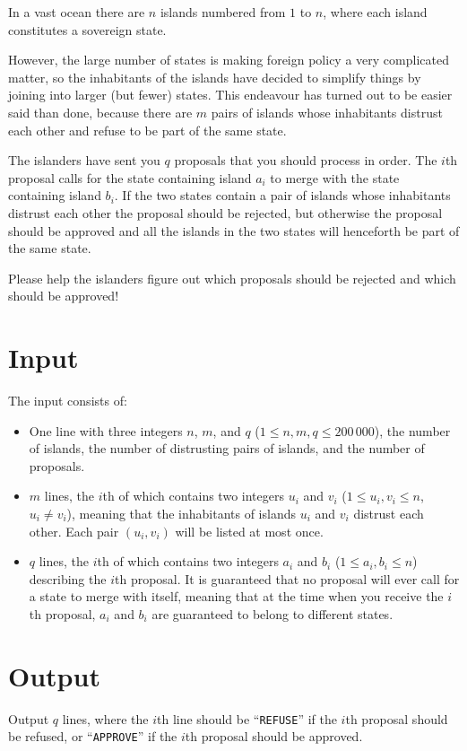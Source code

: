 In a vast ocean there are $n$ islands numbered from $1$ to $n$, where each
island constitutes a sovereign state.

However, the large number of states is making foreign policy a very complicated
matter, so the inhabitants of the islands have decided to simplify things by
joining into larger (but fewer) states. This endeavour has turned out to be
easier said than done, because there are $m$ pairs of islands whose inhabitants
distrust each other and refuse to be part of the same state.

The islanders have sent you $q$ proposals that you should process in order. The
$i$th proposal calls for the state containing island $a_i$ to merge with the
state containing island $b_i$. If the two states contain a pair of islands
whose inhabitants distrust each other the proposal should be rejected, but
otherwise the proposal should be approved and all the islands in the two states
will henceforth be part of the same state.

Please help the islanders figure out which proposals should be rejected and
which should be approved!

\section*{Input}
The input consists of:
\begin{itemize}
  \item One line with three integers $n$, $m$, and $q$ ($1 \leq n,m,q \leq
        200\,000$), the number of islands, the number of distrusting pairs of
        islands, and the number of proposals.
  \item $m$ lines, the $i$th of which contains two integers $u_i$ and $v_i$ ($1
        \leq u_i,v_i \leq n$, $u_i \neq v_i$), meaning that the inhabitants of
        islands $u_i$ and $v_i$ distrust each other. Each pair $(u_i, v_i)$ will be
        listed at most once.
  \item $q$ lines, the $i$th of which contains two integers $a_i$ and $b_i$ ($1
        \leq a_i,b_i \leq n$) describing the $i$th proposal. It is guaranteed
        that no proposal will ever call for a state to merge with itself, meaning
        that at the time when you receive the $i$th proposal, $a_i$ and $b_i$ are
        guaranteed to belong to different states.
\end{itemize}

\section*{Output}
Output $q$ lines, where the $i$th line should be ``\texttt{REFUSE}'' if the $i$th
proposal should be refused, or ``\texttt{APPROVE}'' if the $i$th proposal should
be approved.

